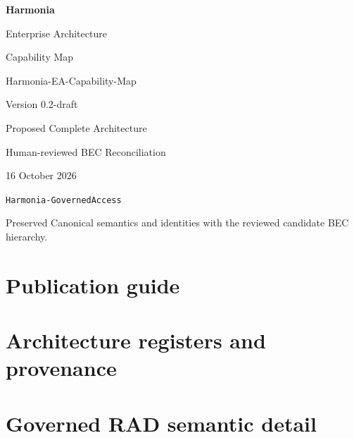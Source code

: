\documentclass[10pt,a4paper,oneside,headings=small]{scrreprt}
\begin{document}
\hypersetup{pageanchor=false}
\begin{titlepage}
\vspace*{24mm}
{\Huge\bfseries\color{Ink} Harmonia\par}
\vspace{8mm}
{\LARGE Enterprise Architecture\par Capability Map\par}
\vspace{12mm}
{\Large Harmonia-EA-Capability-Map\par Version 0.2-draft\par}
\vspace{12mm}
{\large Proposed Complete Architecture\par}
\vfill
Human-reviewed BEC Reconciliation\par
16 October 2026\par
\texttt{Harmonia-GovernedAccess}\par
\vspace{8mm}
Preserved Canonical semantics and identities with the reviewed candidate BEC hierarchy.
\end{titlepage}
\hypersetup{pageanchor=true}
\tableofcontents
\clearpage
{}
\part{Publication guide}




\part{Architecture registers and provenance}







\part{Governed RAD semantic detail}

\clearpage
{}
{}
\renewcommand{\indexname}{Index of architectural names}
\printindex
\end{document}

